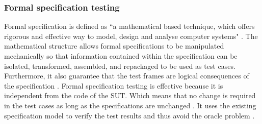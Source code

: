 {\subsubsection{Formal specification testing}
Formal specification is defined as ``a mathematical based technique, which offers rigorous and effective way to model, design and analyse computer systems" \cite{formal1997specification, Hierons2009}. The mathematical structure allows formal specifications to be manipulated mechanically so that information contained within the specification can be isolated, transformed, assembled, and repackaged to be used as test cases. Furthermore, it also guarantee that the test frames are logical consequences of the specification \cite{donat1997automating}. Formal specification testing is effective because it is independent from the code of the SUT. Which means that no change is required in the test cases as long as the specifications are unchanged \cite{gaudel2010software}. It uses the existing specification model to verify the test results and thus avoid the oracle problem \cite{bertolino2007software}.








}

